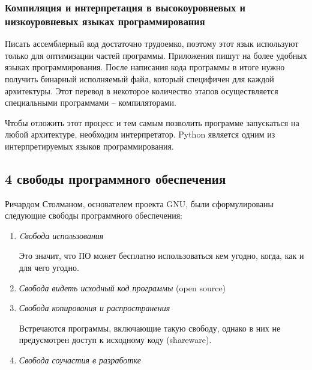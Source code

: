 \documentclass[a4paper, fleqn]{article}
\begin{document}
			\subsubsection*{Компиляция и интерпретация в высокоуровневых и низкоуровневых языках программирования}
			
			Писать ассемблерный код достаточно трудоемко, поэтому этот язык используют только для оптимизации частей программы. Приложения пишут на более удобных языках программирования. После написания кода программы в итоге нужно получить бинарный исполняемый файл, который специфичен для каждой архитектуры. Этот перевод в некоторое количество этапов осуществляется специальными программами – компиляторами. 
			
			Чтобы отложить этот процесс и тем самым позволить программе запускаться на любой архитектуре, необходим интерпретатор.
			Python является одним из интерпретируемых языков программирования.
			
			\subsection*{4 свободы программного обеспечения}
			
			Ричардом Столманом, основателем проекта GNU, были сформулированы следующие свободы программного обеспечения:
			
			\begin{enumerate}
				\item \emph{Cвобода использования}
				
				Это значит, что ПО может бесплатно использоваться кем угодно, когда, как и для чего угодно.
				
				\item \emph{Свобода видеть исходный код программы} (open source)
				
				\item \emph{Свобода копирования и распространения}
				
				Встречаются программы, включающие такую свободу, однако в них не предусмотрен доступ к исходному коду (shareware).
				
				\item \emph{Свобода соучастия в разработке}
				
			\end{enumerate}	
	
\end{document}

